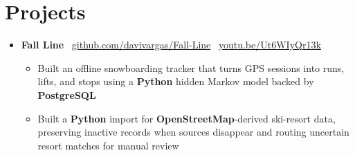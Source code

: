 \documentclass[letterpaper,11pt]{article}
\newcommand{\resumeItem}[1]{
  \item\small{
    {#1 \vspace{-2pt}}
  }
}
\newcommand{\resumeSubHeadingListStart}{\begin{itemize}[leftmargin=0.15in, label={}]}
\newcommand{\resumeSubHeadingListEnd}{\end{itemize}}
\newcommand{\resumeItemListStart}{\begin{itemize}}
\newcommand{\resumeItemListEnd}{\end{itemize}\vspace{-5pt}}
\begin{document}
\section{Projects}
    \resumeSubHeadingListStart
      \item
        \textbf{Fall Line} \textbar\
        \href{https://github.com/davivargas/Fall-Line}{github.com/davivargas/Fall-Line}
        \textbar\
        \href{https://www.youtube.com/watch?v=Ut6WIyQr13k}{youtu.be/Ut6WIyQr13k}
        \vspace{-4pt}
        \resumeItemListStart
          \resumeItem{Built an offline snowboarding tracker that turns GPS sessions into runs, lifts, and stops using a \textbf{Python} hidden Markov model backed by \textbf{PostgreSQL}}
          \resumeItem{Built a \textbf{Python} import for \textbf{OpenStreetMap}-derived ski-resort data, preserving inactive records when sources disappear and routing uncertain resort matches for manual review}
      \resumeItemListEnd
    \resumeSubHeadingListEnd
\end{document}
